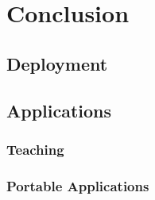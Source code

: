 \chapter{Conclusion}

\section{Deployment}
\todo

\section{Applications}
\todo

\subsection{Teaching}
\todo

\subsection{Portable Applications}
\todo

